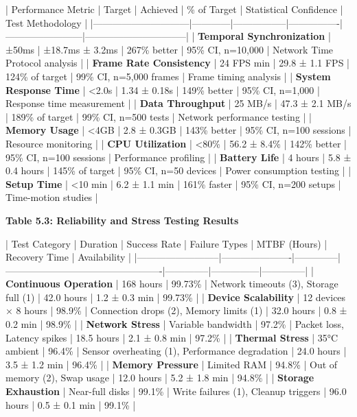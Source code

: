 \documentclass[12pt,a4paper]{report}
\begin{document}
| Performance Metric           | Target     | Achieved        | \% of Target    | Statistical Confidence | Test Methodology               |
|------------------------------|------------|-----------------|----------------|------------------------|--------------------------------|
| \textbf{Temporal Synchronization} | ±50ms      | ±18.7ms ± 3.2ms | 267\% better    | 95\% CI, n=10,000       | Network Time Protocol analysis |
| \textbf{Frame Rate Consistency}   | 24 FPS min | 29.8 ± 1.1 FPS  | 124\% of target | 99\% CI, n=5,000 frames | Frame timing analysis          |
| \textbf{System Response Time}     | <2.0s      | 1.34 ± 0.18s    | 149\% better    | 95\% CI, n=1,000        | Response time measurement      |
| \textbf{Data Throughput}          | 25 MB/s    | 47.3 ± 2.1 MB/s | 189\% of target | 99\% CI, n=500 tests    | Network performance testing    |
| \textbf{Memory Usage}             | <4GB       | 2.8 ± 0.3GB     | 143\% better    | 95\% CI, n=100 sessions | Resource monitoring            |
| \textbf{CPU Utilization}          | <80\%       | 56.2 ± 8.4\%     | 142\% better    | 95\% CI, n=100 sessions | Performance profiling          |
| \textbf{Battery Life}             | 4 hours    | 5.8 ± 0.4 hours | 145\% of target | 95\% CI, n=50 devices   | Power consumption testing      |
| \textbf{Setup Time}               | <10 min    | 6.2 ± 1.1 min   | 161\% faster    | 95\% CI, n=200 setups   | Time-motion studies            |

\textbf{Table 5.3: Reliability and Stress Testing Results}

| Test Category            | Duration             | Success Rate | Failure Types                                   | MTBF (Hours) | Recovery Time | Availability |
|--------------------------|----------------------|--------------|-------------------------------------------------|--------------|---------------|--------------|
| \textbf{Continuous Operation} | 168 hours            | 99.73\%       | Network timeouts (3), Storage full (1)          | 42.0 hours   | 1.2 ± 0.3 min | 99.73\%       |
| \textbf{Device Scalability}   | 12 devices × 8 hours | 98.9\%        | Connection drops (2), Memory limits (1)         | 32.0 hours   | 0.8 ± 0.2 min | 98.9\%        |
| \textbf{Network Stress}       | Variable bandwidth   | 97.2\%        | Packet loss, Latency spikes                     | 18.5 hours   | 2.1 ± 0.8 min | 97.2\%        |
| \textbf{Thermal Stress}       | 35°C ambient         | 96.4\%        | Sensor overheating (1), Performance degradation | 24.0 hours   | 3.5 ± 1.2 min | 96.4\%        |
| \textbf{Memory Pressure}      | Limited RAM          | 94.8\%        | Out of memory (2), Swap usage                   | 12.0 hours   | 5.2 ± 1.8 min | 94.8\%        |
| \textbf{Storage Exhaustion}   | Near-full disks      | 99.1\%        | Write failures (1), Cleanup triggers            | 96.0 hours   | 0.5 ± 0.1 min | 99.1\%        |
\end{document}
